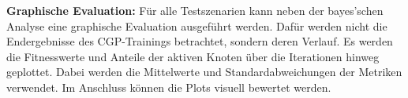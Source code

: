 \textbf{Graphische Evaluation:} Für alle Testszenarien kann neben der bayes'schen Analyse eine graphische Evaluation ausgeführt werden.
Dafür werden nicht die Endergebnisse des CGP-Trainings betrachtet, sondern deren Verlauf.
Es werden die Fitnesswerte und Anteile der aktiven Knoten über die Iterationen hinweg geplottet.
Dabei werden die Mittelwerte und Standardabweichungen der Metriken verwendet.
Im Anschluss können die Plots visuell bewertet werden.\\


